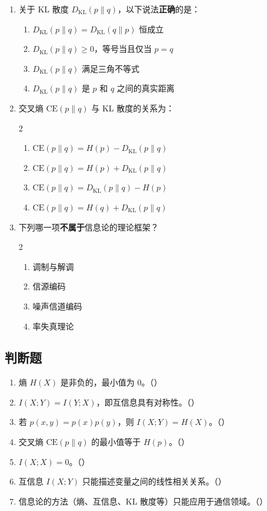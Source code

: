 \documentclass[12pt,a4paper]{ctexart}
\newcommand{\DKL}{D_{\mathrm{KL}}}
\begin{document}
\begin{enumerate}[label=\arabic*., leftmargin=*]
\item 关于 KL 散度 $\DKL(p\|q)$，以下说法\textbf{正确}的是：
\begin{enumerate}[label=(\Alph*)]
  \item $\DKL(p\|q) = \DKL(q\|p)$ 恒成立
  \item $\DKL(p\|q) \geq 0$，等号当且仅当 $p = q$
  \item $\DKL(p\|q)$ 满足三角不等式
  \item $\DKL(p\|q)$ 是 $p$ 和 $q$ 之间的真实距离
\end{enumerate}

\item 交叉熵 $\mathrm{CE}(p\|q)$ 与 KL 散度的关系为：
\begin{multicols}{2}
\begin{enumerate}[label=(\Alph*)]
  \item $\mathrm{CE}(p\|q) = H(p) - \DKL(p\|q)$
  \item $\mathrm{CE}(p\|q) = H(p) + \DKL(p\|q)$
  \item $\mathrm{CE}(p\|q) = \DKL(p\|q) - H(p)$
  \item $\mathrm{CE}(p\|q) = H(q) + \DKL(p\|q)$
\end{enumerate}
\end{multicols}

\item 下列哪一项\textbf{不属于}信息论的理论框架？
\begin{multicols}{2}
\begin{enumerate}[label=(\Alph*)]
  \item 调制与解调
  \item 信源编码
  \item 噪声信道编码
  \item 率失真理论
\end{enumerate}
\end{multicols}

\end{enumerate}

\subsection*{判断题}

\begin{enumerate}[label=\arabic*., leftmargin=*]
\item 熵 $H(X)$ 是非负的，最小值为 0。（\quad）
\item $I(X;Y) = I(Y;X)$，即互信息具有对称性。（\quad）
\item 若 $p(x,y) = p(x)p(y)$，则 $I(X;Y) = H(X)$。（\quad）
\item 交叉熵 $\mathrm{CE}(p\|q)$ 的最小值等于 $H(p)$。（\quad）
\item $I(X;X) = 0$。（\quad）
\item 互信息 $I(X;Y)$ 只能描述变量之间的线性相关关系。（\quad）
\item 信息论的方法（熵、互信息、KL 散度等）只能应用于通信领域。（\quad）
\end{enumerate}
\end{document}

